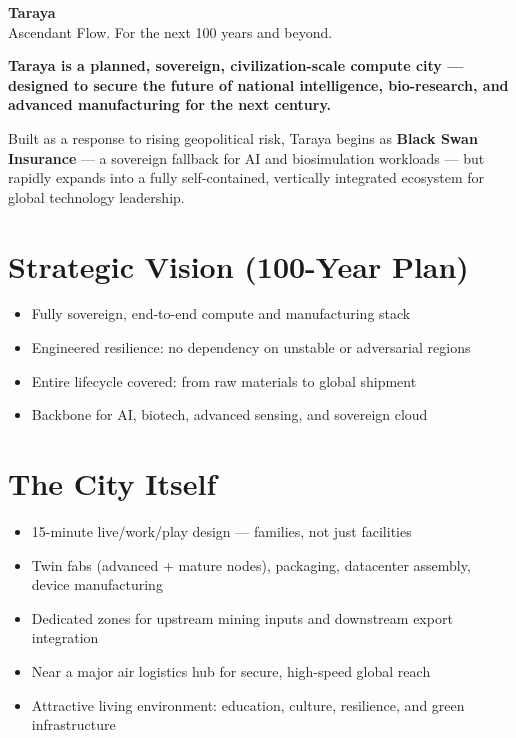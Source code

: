 \documentclass[12pt]{article}
\begin{document}
\begin{center}
    {\huge \textbf{Taraya}}\\[0.5em]
    {\Large Ascendant Flow. For the next 100 years and beyond.}\\[2em]
\end{center}

\begin{spacing}{1.15}

\noindent
\textbf{Taraya is a planned, sovereign, civilization-scale compute city — designed to secure the future of national intelligence, bio-research, and advanced manufacturing for the next century.}

\vspace{1em}
\noindent
Built as a response to rising geopolitical risk, Taraya begins as \textbf{Black Swan Insurance} — a sovereign fallback for AI and biosimulation workloads — but rapidly expands into a fully self-contained, vertically integrated ecosystem for global technology leadership.

\section*{Strategic Vision (100-Year Plan)}
\begin{itemize}
  \item Fully sovereign, end-to-end compute and manufacturing stack
  \item Engineered resilience: no dependency on unstable or adversarial regions
  \item Entire lifecycle covered: from raw materials to global shipment
  \item Backbone for AI, biotech, advanced sensing, and sovereign cloud
\end{itemize}

\section*{The City Itself}
\begin{itemize}
  \item 15-minute live/work/play design — families, not just facilities
  \item Twin fabs (advanced + mature nodes), packaging, datacenter assembly, device manufacturing
  \item Dedicated zones for upstream mining inputs and downstream export integration
  \item Near a major air logistics hub for secure, high-speed global reach
  \item Attractive living environment: education, culture, resilience, and green infrastructure
\end{itemize}


\end{spacing}
\end{document}
